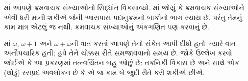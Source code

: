 \documentclass[../../../include/open-logic-section]{subfiles}
\begin{document}


માં આપણે ક્રમવાચક સંખ્યાઓનો
સિદ્ધાંત વિકસાવ્યો. માં જોયું કે
ક્રમવાચક સંખ્યાઓને એવી ધરી માની શકીએ જેની આસપાસ
પદાનુક્રમનો બાકીનો ભાગ રચાય છે. પરંતુ તેમનું કામ માત્ર
એટલું જ નથી. ક્રમવાચક સંખ્યાઓનું અંકગણિત પણ કરવાનું છે.

માં $\omega$,
$\omega+1$ અને $\omega+\omega$ની વાત કરતાં આપણે
તેનો સંકેત આપી દીધો હતો. ત્યારે વાત અનૌપચારિક હતી;
હવે તેને ચોક્કસ રીતે સમજાવવાનો સમય છે. જોકે ઉલ્લેખ
કરવો જોઈએ કે આ પ્રકરણમાં તત્ત્વચિંતન બહુ ઓછું છે:
તકનિકી વિકાસ છે અને સાથે એક (થોડું) રસપ્રદ અવલોકન
છે કે એ જ કામ બે જુદી રીતે કરી શકીએ છીએ.
\end{document}
